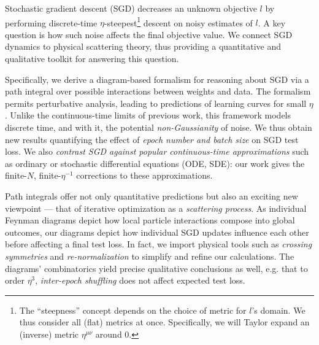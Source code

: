 \documentclass{article}
\begin{document}

        Stochastic gradient descent (SGD) decreases an unknown objective $l$ by
        performing discrete-time $\eta$-steepest\footnote{
            The ``steepness'' concept depends on the choice of metric for
            $l$'s domain.  We thus consider all (flat) metrics at once.
            Specifically, we will Taylor expand an (inverse) metric
            $\eta^{\mu\nu}$ around $0$.
        } descent on noisy estimates of $l$.  A key question is how such noise
        affects the final objective value.  We connect SGD dynamics to physical
        scattering theory, thus providing a quantitative and qualitative
        toolkit for answering this question.


        Specifically, we derive a diagram-based formalism for reasoning about
        SGD via a path integral over possible interactions between weights and
        data.  The formalism permits perturbative analysis, leading to
        predictions of learning curves for small $\eta$.  Unlike the
        continuous-time limits of previous work, this framework models discrete
        time, and with it, the potential \emph{non-Gaussianity} of noise.  We
        thus obtain new results quantifying the effect of \emph{epoch number
        and batch size} on SGD test loss.  We also \emph{contrast SGD against
        popular continuous-time approximations} such as ordinary or stochastic
        differential equations (ODE, SDE): our work gives the finite-$N$,
        finite-$\eta^{-1}$ corrections to these approximations.
        

        Path integrals offer not only quantitative predictions but also an
        exciting new viewpoint --- that of iterative optimization as a
        \emph{scattering process}.  As individual Feynman diagrams 
        \citep{dy49a} depict how local particle interactions compose into
        global outcomes, our diagrams depict how individual SGD updates
        influence each other before affecting a final test loss.  In fact, we
        import physical tools such as \emph{crossing symmetries} 
        \citep{dy49b} and \emph{re-normalization} \citep{ge54} to
        simplify and refine our calculations.  The diagrams' combinatorics
        yield precise qualitative conclusions as well, e.g. that to
        order $\eta^3$, \emph{inter-epoch shuffling} does not affect expected
        test loss.
\end{document}
